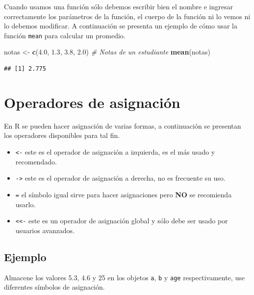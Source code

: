 \documentclass[10pt,]{krantz}
\makeatletter
\newenvironment{Shaded}{\begin{snugshade}}{\end{snugshade}}
\newcommand{\KeywordTok}[1]{\textcolor[rgb]{0.13,0.29,0.53}{\textbf{{#1}}}}
\newcommand{\FloatTok}[1]{\textcolor[rgb]{0.00,0.00,0.81}{{#1}}}
\newcommand{\StringTok}[1]{\textcolor[rgb]{0.31,0.60,0.02}{{#1}}}
\newcommand{\CommentTok}[1]{\textcolor[rgb]{0.56,0.35,0.01}{\textit{{#1}}}}
\newcommand{\NormalTok}[1]{{#1}}
\providecommand{\tightlist}{%
  \setlength{\itemsep}{0pt}\setlength{\parskip}{0pt}}
\let\proglang=\textsf
\newenvironment{kframe}{%
\medskip{}
\setlength{\fboxsep}{.8em}
 \def\at@end@of@kframe{}%
 \ifinner\ifhmode%
  \def\at@end@of@kframe{\end{minipage}}%
  \begin{minipage}{\columnwidth}%
 \fi\fi%
 \def\FrameCommand##1{\hskip\@totalleftmargin \hskip-\fboxsep
 \colorbox{shadecolor}{##1}\hskip-\fboxsep
     \hskip-\linewidth \hskip-\@totalleftmargin \hskip\columnwidth}%
 \MakeFramed {\advance\hsize-\width
   \@totalleftmargin\z@ \linewidth\hsize
   \@setminipage}}%
 {\par\unskip\endMakeFramed%
 \at@end@of@kframe}
\renewenvironment{Shaded}{\begin{kframe}}{\end{kframe}}
\makeatother
\begin{document}
Cuando usamos una función sólo debemos escribir bien el nombre e
ingresar correctamente los parámetros de la función, el cuerpo de la
función ni lo vemos ni lo debemos modificar. A continuación se presenta
un ejemplo de cómo usar la función \texttt{mean} para calcular un
promedio.

\begin{Shaded}
\begin{Highlighting}[]
\NormalTok{notas <-}\StringTok{ }\KeywordTok{c}\NormalTok{(}\FloatTok{4.0}\NormalTok{, }\FloatTok{1.3}\NormalTok{, }\FloatTok{3.8}\NormalTok{, }\FloatTok{2.0}\NormalTok{)  }\CommentTok{# Notas de un estudiante}
\KeywordTok{mean}\NormalTok{(notas)}
\end{Highlighting}
\end{Shaded}

\begin{verbatim}
## [1] 2.775
\end{verbatim}

\section{\texorpdfstring{Operadores de asignación
}{Operadores de asignación }}\label{operadores-de-asignacion}

En \proglang{R} se pueden hacer asignación de varias formas, a
continuación se presentan los operadores disponibles para tal fin.

\begin{itemize}
\tightlist
\item
  \texttt{\textless{}-} este es el operador de asignación a izquierda,
  es el más usado y recomendado.
\item
  \texttt{-\textgreater{}} este es el operador de asignación a derecha,
  no es frecuente su uso.
\item
  \texttt{=} el símbolo igual sirve para hacer asignaciones pero
  \textbf{NO} se recomienda usarlo.
\item
  \texttt{\textless{}\textless{}-} este es un operador de asignación
  global y sólo debe ser usado por usuarios avanzados.
\end{itemize}

\subsection*{Ejemplo}\label{ejemplo-5}


Almacene los valores 5.3, 4.6 y 25 en los objetos \texttt{a}, \texttt{b}
y \texttt{age} respectivamente, use diferentes símbolos de asignación.
\end{document}
